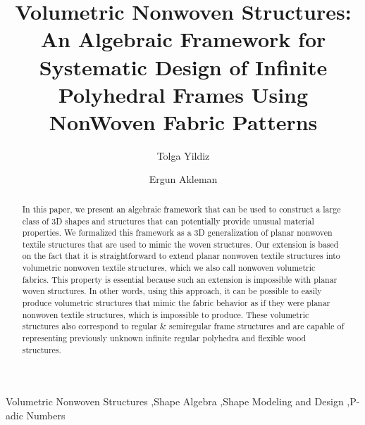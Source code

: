 \documentclass[times,twocolumn,final]{elsarticle}
\begin{document}

\begin{frontmatter}


\title{Volumetric Nonwoven Structures: An Algebraic Framework for Systematic Design of Infinite Polyhedral Frames Using NonWoven Fabric Patterns}


\author[1]{Tolga Yildiz}

    
\author[2]{Ergun Akleman }

\address[1]{Department of Computer Science and Engineering, Texas A\&M University, College Station, TX, 77840, USA}
\address[2]{Visual Computing and Computational Media Section, School of Performance, Visualization and Fine Arts, Joint with Department of Computer Science and Engineering, Texas A\&M University, College Station, TX, 77840, USA}


\received{\today}


\begin{abstract}
In this paper, we present an algebraic framework that can be used to construct a large class of 3D shapes and structures that can potentially provide unusual material properties. We formalized this framework as a 3D generalization of planar nonwoven textile structures that are used to mimic the woven structures. Our extension is based on the fact that it is straightforward to extend planar nonwoven textile structures into volumetric nonwoven textile structures, which we also call nonwoven volumetric fabrics. This property is essential because such an extension is impossible with planar woven structures. In other words, using this approach, it can be possible to easily produce volumetric structures that mimic the fabric behavior as if they were planar nonwoven textile structures, which is impossible to produce. These volumetric structures also correspond to regular \& semiregular frame structures and are capable of representing previously unknown infinite regular polyhedra and flexible wood structures.  
\end{abstract}

\begin{keyword}
\KWD Volumetric Nonwoven Structures \sep Shape Algebra \sep Shape Modeling and Design \sep P-adic Numbers 
\end{keyword}

\end{frontmatter}
\end{document}
